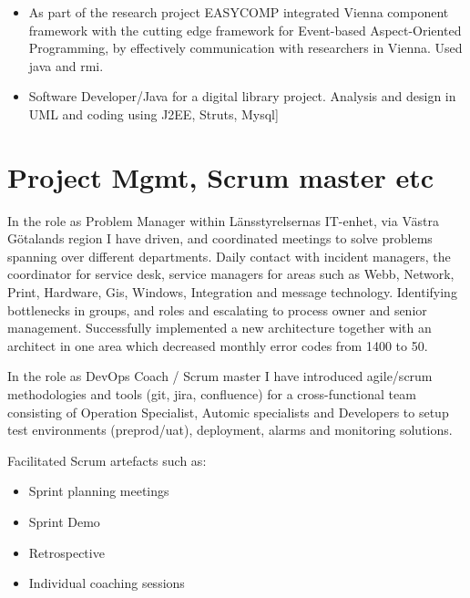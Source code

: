 \documentclass[11pt,a4paper,sans]{moderncv}
\begin{document}
\begin{itemize}
 \item As part of the research project EASYCOMP integrated Vienna component framework with the cutting edge framework for Event-based Aspect-Oriented Programming, by effectively communication with researchers in Vienna. Used java and rmi. 

 \item Software Developer/Java for a digital library project. Analysis and design in UML and coding using J2EE, Struts, Mysql] 
\end{itemize}


\large
\section {Project Mgmt, Scrum master etc}


In the role as Problem Manager within Länsstyrelsernas IT-enhet, via Västra Götalands region I have driven, and coordinated meetings to solve problems spanning over different departments. Daily contact with incident managers, the coordinator for service desk, service managers for areas such as Webb, Network, Print, Hardware, Gis, Windows, Integration and message technology. Identifying bottlenecks in groups, and roles and escalating to process owner and senior management. Successfully implemented a new architecture together with an architect in one area which decreased monthly error codes from 1400 to 50.  

In the role as DevOps Coach / Scrum master I have introduced agile/scrum methodologies and tools (git, jira, confluence) for a cross-functional team consisting of Operation Specialist, Automic specialists and Developers to setup test environments (preprod/uat), deployment, alarms and monitoring solutions. 

Facilitated Scrum artefacts such as: 
\begin{itemize}
    \item Sprint planning meetings 
    \item Sprint Demo 
    \item Retrospective 
    \item Individual coaching sessions 
\end{itemize}
\end{document}
